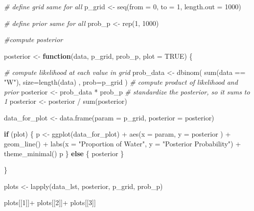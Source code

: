 \documentclass[
]{book}
\newenvironment{Shaded}{\begin{snugshade}}{\end{snugshade}}
\newcommand{\AttributeTok}[1]{\textcolor[rgb]{0.77,0.63,0.00}{#1}}
\newcommand{\CommentTok}[1]{\textcolor[rgb]{0.56,0.35,0.01}{\textit{#1}}}
\newcommand{\ConstantTok}[1]{\textcolor[rgb]{0.00,0.00,0.00}{#1}}
\newcommand{\ControlFlowTok}[1]{\textcolor[rgb]{0.13,0.29,0.53}{\textbf{#1}}}
\newcommand{\DecValTok}[1]{\textcolor[rgb]{0.00,0.00,0.81}{#1}}
\newcommand{\FunctionTok}[1]{\textcolor[rgb]{0.00,0.00,0.00}{#1}}
\newcommand{\NormalTok}[1]{#1}
\newcommand{\OtherTok}[1]{\textcolor[rgb]{0.56,0.35,0.01}{#1}}
\newcommand{\SpecialCharTok}[1]{\textcolor[rgb]{0.00,0.00,0.00}{#1}}
\newcommand{\StringTok}[1]{\textcolor[rgb]{0.31,0.60,0.02}{#1}}
\begin{document}
\begin{Shaded}
\begin{Highlighting}[]
\CommentTok{\# define grid same for all}
\NormalTok{p\_grid }\OtherTok{\textless{}{-}} \FunctionTok{seq}\NormalTok{(}\AttributeTok{from =} \DecValTok{0}\NormalTok{, }\AttributeTok{to =} \DecValTok{1}\NormalTok{, }\AttributeTok{length.out =} \DecValTok{1000}\NormalTok{)}

\CommentTok{\# define prior same for all}
\NormalTok{prob\_p }\OtherTok{\textless{}{-}} \FunctionTok{rep}\NormalTok{(}\DecValTok{1}\NormalTok{, }\DecValTok{1000}\NormalTok{)}

\CommentTok{\#compute posterior }

\NormalTok{posterior }\OtherTok{\textless{}{-}} \ControlFlowTok{function}\NormalTok{(data, p\_grid, prob\_p, }\AttributeTok{plot =} \ConstantTok{TRUE}\NormalTok{) \{}
  
\CommentTok{\# compute likelihood at each value in grid}
\NormalTok{prob\_data }\OtherTok{\textless{}{-}} \FunctionTok{dbinom}\NormalTok{( }
  \FunctionTok{sum}\NormalTok{(data }\SpecialCharTok{==} \StringTok{"W"}\NormalTok{), }
  \AttributeTok{size=}\FunctionTok{length}\NormalTok{(data) , }
  \AttributeTok{prob=}\NormalTok{p\_grid )}
\CommentTok{\# compute product of likelihood and prior}
\NormalTok{posterior }\OtherTok{\textless{}{-}}\NormalTok{ prob\_data }\SpecialCharTok{*}\NormalTok{ prob\_p}
\CommentTok{\# standardize the posterior, so it sums to 1}
\NormalTok{posterior }\OtherTok{\textless{}{-}}\NormalTok{ posterior }\SpecialCharTok{/} \FunctionTok{sum}\NormalTok{(posterior)}

\NormalTok{data\_for\_plot }\OtherTok{\textless{}{-}} \FunctionTok{data.frame}\NormalTok{(}\AttributeTok{param =}\NormalTok{ p\_grid, }\AttributeTok{posterior =}\NormalTok{ posterior)}

\ControlFlowTok{if}\NormalTok{ (plot) \{}
\NormalTok{ p }\OtherTok{\textless{}{-}}  \FunctionTok{ggplot}\NormalTok{(data\_for\_plot) }\SpecialCharTok{+} 
   \FunctionTok{aes}\NormalTok{(}\AttributeTok{x =}\NormalTok{ param, }\AttributeTok{y =}\NormalTok{ posterior ) }\SpecialCharTok{+} 
   \FunctionTok{geom\_line}\NormalTok{() }\SpecialCharTok{+}
   \FunctionTok{labs}\NormalTok{(}\AttributeTok{x =} \StringTok{"Proportion of Water"}\NormalTok{, }\AttributeTok{y =} \StringTok{"Posterior Probability"}\NormalTok{) }\SpecialCharTok{+} 
   \FunctionTok{theme\_minimal}\NormalTok{()}
\NormalTok{ p}
\NormalTok{\} }\ControlFlowTok{else}\NormalTok{ \{}
\NormalTok{  posterior}
\NormalTok{\}}

\NormalTok{\}}


\NormalTok{plots }\OtherTok{\textless{}{-}} \FunctionTok{lapply}\NormalTok{(data\_lst, posterior, p\_grid, prob\_p)}

\NormalTok{plots[[}\DecValTok{1}\NormalTok{]]}\SpecialCharTok{+}\NormalTok{ plots[[}\DecValTok{2}\NormalTok{]]}\SpecialCharTok{+}\NormalTok{ plots[[}\DecValTok{3}\NormalTok{]]}
\end{Highlighting}
\end{Shaded}
\end{document}
